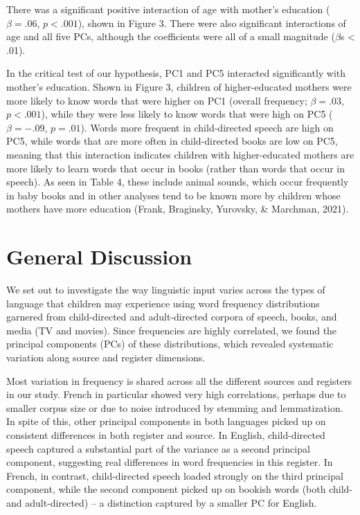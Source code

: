 \documentclass[10pt, letterpaper]{article}
\begin{document}
There was a significant positive interaction of age with mother's
education (\(\beta=.06\), \(p<.001\)), shown in Figure 3. There were
also significant interactions of age and all five PCs, although the
coefficients were all of a small magnitude (\(\beta\)s \textless{} .01).

In the critical test of our hypothesis, PC1 and PC5 interacted
significantly with mother's education. Shown in Figure 3, children of
higher-educated mothers were more likely to know words that were higher
on PC1 (overall frequency; \(\beta = .03\), \(p<.001\)), while they were
less likely to know words that were high on PC5 (\(\beta = -.09\),
\(p=.01\)). Words more frequent in child-directed speech are high on
PC5, while words that are more often in child-directed books are low on
PC5, meaning that this interaction indicates children with
higher-educated mothers are more likely to learn words that occur in
books (rather than words that occur in speech). As seen in Table 4,
these include animal sounds, which occur frequently in baby books and in
other analyses tend to be known more by children whose mothers have more
education (Frank, Braginsky, Yurovsky, \& Marchman, 2021).

\hypertarget{general-discussion}{%
\section{General Discussion}\label{general-discussion}}

We set out to investigate the way linguistic input varies across the
types of language that children may experience using word frequency
distributions garnered from child-directed and adult-directed corpora of
speech, books, and media (TV and movies). Since frequencies are highly
correlated, we found the principal components (PCs) of these
distributions, which revealed systematic variation along source and
register dimensions.

Most variation in frequency is shared across all the different sources
and registers in our study. French in particular showed very high
correlations, perhaps due to smaller corpus size or due to noise
introduced by stemming and lemmatization. In spite of this, other
principal components in both languages picked up on consistent
differences in both register and source. In English, child-directed
speech captured a substantial part of the variance as a second principal
component, suggesting real differences in word frequencies in this
register. In French, in contrast, child-directed speech loaded strongly
on the third principal component, while the second component picked up
on bookish words (both child- and adult-directed) -- a distinction
captured by a smaller PC for English.
\end{document}
